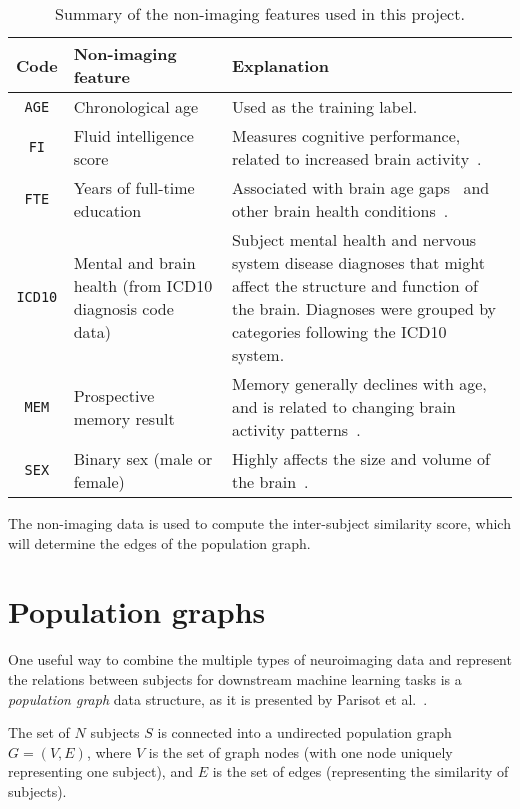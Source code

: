 \begin{table}[]
    \caption{Summary of the non-imaging features used in this project.}\label{table:phenotype-features}
    \centering
    \begin{tabular}{cp{6cm}p{7.5cm}}
        \hline
    \textbf{Code} & \textbf{Non-imaging feature} & \textbf{Explanation} \\ \hline
    \texttt{AGE} & Chronological age &  Used as the training label. \\
    \texttt{FI} & Fluid intelligence score &  Measures cognitive performance, related to increased brain activity~\cite{gray2003neural}. \\
    \texttt{FTE} & Years of full-time education &  Associated with brain age gaps~\cite{steffener2016differences} and other brain health conditions~\cite{brayne2010education}.\\
    \texttt{ICD10} & Mental and brain health (from ICD10 diagnosis code data) & Subject mental health and nervous system disease diagnoses that might affect the structure and function of the brain. Diagnoses were grouped by categories following the ICD10 system. \\
    \texttt{MEM} & Prospective memory result & Memory generally declines with age, and is related to changing brain activity patterns~\cite{grady2000changes, kliegel2006delayed}. \\
    \texttt{SEX} & Binary sex (male or female) & Highly affects the size and volume of the brain~\cite{ruigrok2014meta}. \\ \hline
    \end{tabular}
\end{table}

The non-imaging data is used to compute the inter-subject similarity score, which will determine the edges of the population graph.

\section{Population graphs}
\label{population-graphs}

One useful way to combine the multiple types of neuroimaging data and represent the relations between subjects for downstream machine learning tasks is a \textit{population graph} data structure, as it is presented by Parisot et al.~\cite{parisot2018disease}.

The set of $N$ subjects $S$ is connected into a undirected population graph $G = (V, E)$, where $V$ is the set of graph nodes (with one node uniquely representing one subject), and $E$ is the set of edges (representing the similarity of subjects).

